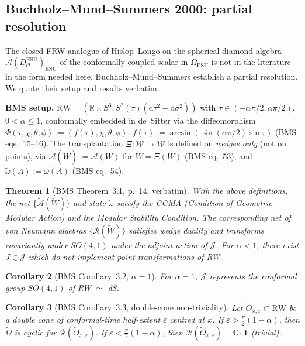 \documentclass[11pt]{article}
\newtheorem{theorem}{Theorem}
\newtheorem{corollary}[theorem]{Corollary}
\theoremstyle{definition}
\newcommand{\R}{\mathbb{R}}
\newcommand{\C}{\mathbb{C}}
\renewcommand{\AA}{\mathcal{A}}
\newcommand{\OO}{\mathcal{O}}
\newcommand{\ESU}{\mathrm{ESU}}
\begin{document}
\subsection{Buchholz--Mund--Summers 2000: partial resolution}\label{sec:bms}

The closed-FRW analogue of Hislop--Longo on the spherical-diamond algebra
$\AA(D_\OO^\ESU)_\ESU$ of the conformally coupled scalar in $\Omega_\ESU$
is not in the literature in the form needed here. Buchholz--Mund--Summers
\cite{BMS2000} establish a partial resolution. We quote their setup and
results verbatim.

\medskip

\noindent\textbf{BMS setup.} $\mathrm{RW}=(\R\times S^3,
S^2(\tau)(\mathrm{d}\tau^2-\mathrm{d}\sigma^2))$ with
$\tau\in(-\alpha\pi/2,\alpha\pi/2)$, $0<\alpha\le 1$, conformally embedded
in de~Sitter via the diffeomorphism $\Phi(\tau,\chi,\theta,\phi):=
(f(\tau),\chi,\theta,\phi)$, $f(\tau):=
\arcsin(\sin(\alpha\pi/2)\sin\tau)$ (BMS eqs.~15--16). The transplantation
$\Xi:\mathcal W\to\widetilde{\mathcal W}$ is defined on \emph{wedges only}
(not on points), via
$\widetilde{\mathcal A}(\widetilde W):=\mathcal A(W)$ for
$\widetilde W=\Xi(W)$ (BMS eq.~53), and
$\widetilde\omega(A):=\omega(A)$ (BMS eq.~54).

\begin{theorem}[BMS Theorem~3.1, p.~14, verbatim]\label{thm:BMS-31}
With the above definitions, the net $\{\widetilde{\mathcal A}(\widetilde W)\}$
and state $\widetilde\omega$ satisfy the CGMA (Condition of Geometric
Modular Action) and the Modular Stability Condition. The corresponding net
of von Neumann algebras $\{\widetilde{\mathcal R}(\widetilde W)\}$ satisfies
wedge duality and transforms covariantly under $SO(4,1)$ under the adjoint
action of $\mathcal J$. For $\alpha<1$, there exist $J\in\mathcal J$ which
do not implement point transformations of RW.
\end{theorem}

\begin{corollary}[BMS Corollary~3.2, $\alpha=1$]\label{thm:BMS-32}
For $\alpha=1$, $\mathcal J$ represents the conformal group $SO(4,1)$ of RW
$\simeq$ dS.
\end{corollary}

\begin{corollary}[BMS Corollary~3.3, double-cone non-triviality]\label{thm:BMS-33}
Let $\widetilde O_{x,\varepsilon}\subset\mathrm{RW}$ be a double cone of
conformal-time half-extent $\varepsilon$ centred at $x$.
If $\varepsilon>\frac{\pi}{2}(1-\alpha)$, then $\widetilde\Omega$ is cyclic
for $\widetilde{\mathcal R}(\widetilde O_{x,\varepsilon})$. If
$\varepsilon<\frac{\pi}{2}(1-\alpha)$, then
$\widetilde{\mathcal R}(\widetilde O_{x,\varepsilon})=\C\cdot\mathbf 1$
(trivial).
\end{corollary}
\end{document}
